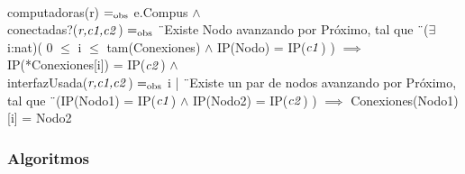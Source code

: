  \\
 computadoras(r) $=_{\mathrm{obs}}$ e.Compus $\land$ \\
 conectadas?($\text{\textit{r,c1,c2}}$) $=_{\mathrm{obs}}$ \"\ Existe Nodo avanzando por Próximo, tal que \" \ 
 							($\exists$i:nat)( 0 $\leq$ i $\leq$ tam(Conexiones) $\land$ IP(Nodo) = IP($\text{\textit{c1}}$) ) $\implies$ IP(*Conexiones[i]) = IP($\text{\textit{c2}}$) $\land$ \\
 interfazUsada($\text{\textit{r,c1,c2}}$) $=_{\mathrm{obs}}$ i | \"\ Existe un par de nodos avanzando por Próximo, tal que \" \
 							 (IP(Nodo1) = IP($\text{\textit{c1}}$) $\land$ IP(Nodo2) = IP($\text{\textit{c2}}$) ) $\implies$ Conexiones(Nodo1)[i] = Nodo2


\subsubsection*{Algoritmos}







